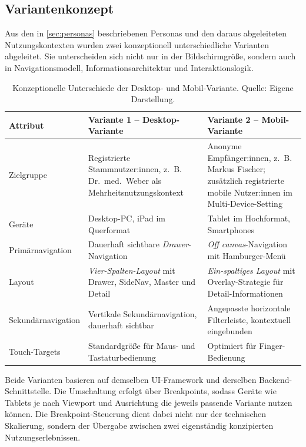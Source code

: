 \subsection{Variantenkonzept}\label{subsec:varianten}

Aus den in \autoref{sec:personas} beschriebenen Personas und den daraus abgeleiteten Nutzungskontexten wurden zwei konzeptionell unterschiedliche Varianten abgeleitet. Sie unterscheiden sich nicht nur in der Bildschirmgröße, sondern auch in Navigationsmodell, Informationsarchitektur und Interaktionslogik.

\begin{table}[H]
    \centering
    \scriptsize
    \begin{tabular}{@{}p{2.7cm}p{7.0cm}p{6.0cm}@{}}
        \toprule
        \textbf{Attribut} & \textbf{Variante 1 -- Desktop-Variante} & \textbf{Variante 2 -- Mobil-Variante} \\
        \midrule
        Zielgruppe & Registrierte Stammnutzer:innen, z.~B. Dr.~med.~Weber als Mehrheitsnutzungskontext & Anonyme Empfänger:innen, z.~B. Markus Fischer; zusätzlich registrierte mobile Nutzer:innen im Multi-Device-Setting \\
        \addlinespace
        Geräte & Desktop-PC, iPad im Querformat & Tablet im Hochformat, Smartphones \\
        \addlinespace
        Primärnavigation & Dauerhaft sichtbare \emph{Drawer}-Navigation & \textit{Off canvas}-Navigation mit Hamburger-Menü \parencite[Kap.~15.1.10]{erlhoferWebsiteKonzeptionUndRelaunch2017} \\
        \addlinespace
        Layout & \emph{Vier-Spalten-Layout} mit Drawer, SideNav, Master und Detail & \emph{Ein-spaltiges Layout} mit Overlay-Strategie für Detail-Informationen \\
        \addlinespace
        Sekundärnavigation & Vertikale Sekundärnavigation, dauerhaft sichtbar & Angepasste horizontale Filterleiste, kontextuell eingebunden \\
        \addlinespace
        Touch-Targets & Standardgröße für Maus- und Tastaturbedienung & Optimiert für Finger-Bedienung \\
        \bottomrule
    \end{tabular}
    \caption[Varianten-Vergleich Desktop vs.\ Mobil]{Konzeptionelle Unterschiede der Desktop- und Mobil-Variante. Quelle: Eigene Darstellung.}
    \label{tab:varianten_vergleich}
\end{table}

Beide Varianten basieren auf demselben UI-Framework und derselben Backend-Schnittstelle. Die Umschaltung erfolgt über Breakpoints, sodass Geräte wie Tablets je nach Viewport und Ausrichtung die jeweils passende Variante nutzen können. Die Breakpoint-Steuerung dient dabei nicht nur der technischen Skalierung, sondern der Übergabe zwischen zwei eigenständig konzipierten Nutzungserlebnissen.

